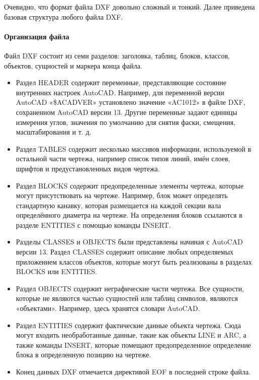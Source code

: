 Очевидно, что формат файла DXF довольно сложный и тонкий. Далее приведена базовая структура любого файла DXF.

\paragraph{Организация файла}

Файл DXF состоит из семи разделов: заголовка, таблиц, блоков, классов, объектов, сущностей и маркера конца файла.

\begin{itemize}
	\item Раздел HEADER содержит переменные, представляющие состояние внутренних настроек AutoCAD. Например, для переменной версии AutoCAD «\$ACADVER» установлено значение «AC1012» в файле DXF, сохраненном AutoCAD версии 13. Другие переменные задают единицы измерения углов, значения по умолчанию для снятия фаски, смещения, масштабирования и т. д.
	\item Раздел TABLES содержит несколько массивов информации, используемой в остальной части чертежа, например список типов линий, имён слоев, шрифтов и предустановленных видов чертежа.
	\item Раздел BLOCKS содержит предопределенные элементы чертежа, которые могут присутствовать на чертеже. Например, блок может определять стандартную канавку, которая размещается на каждой секции вала определённого диаметра на чертеже. На определения блоков ссылаются в разделе ENTITIES с помощью команды INSERT.
	\item Разделы CLASSES и OBJECTS были представлены начиная с AutoCAD версии 13. Раздел CLASSES содержит описание любых определяемых приложением классов объектов, которые могут быть реализованы в разделах BLOCKS или ENTITIES.
	\item Раздел OBJECTS содержит неграфические части чертежа. Все сущности, которые не являются частью сущностей или таблиц символов, являются «объектами». Например, здесь хранятся словари AutoCAD.
	\item Раздел ENTITIES содержит фактические данные объекта чертежа. Сюда могут входить необработанные данные, такие как объекты LINE и ARC, а также команды INSERT, которые помещают предопределенное определение блока в определенную позицию на чертеже.
	\item Конец данных DXF отмечается директивой EOF в последней строке файла.
\end{itemize}

